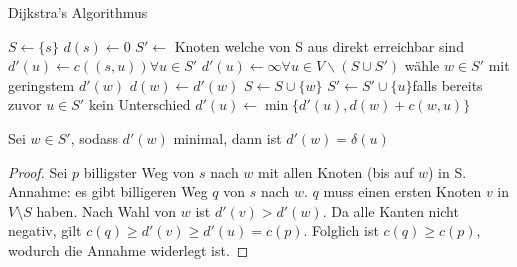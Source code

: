             \begin{algorithm}
            	\capstart
            	\caption{Dijkstra's Algorithmus}
            	\begin{algorithmic}
            		\State $S\gets \{s\}$
            		\State $d(s)\gets 0$
            		\State $S'\gets$  \Comment Knoten welche von S aus direkt erreichbar sind
            		\State $d'(u)\gets c((s,u)) \forall u\in S'$
            		\State $d'(u)\gets \infty \forall u\in V\backslash \left(S\cup S'\right)$
            			\State wähle $w\in S'$ mit geringstem $d'(w)$
            			\State $d(w)\gets d'(w)$
            			\State $S\gets S\cup \{w\}$
            					\State $S'\gets S'\cup \{u\}$\Comment falls bereits zuvor $u\in S'$ kein Unterschied
            					\State $d'(u)\gets \min\{d'(u),d(w)+c(w,u)\}$
            				\EndIf
            			\EndFor
            		\EndWhile
            	\end{algorithmic}
            	\label{alg:Dijkstras}
            \end{algorithm}
            


            \begin{lemma}
                Sei $w \in S'$, sodass $d'(w)$ minimal, dann ist $d'(w) = \delta(u)$
                \begin{proof}
                    Sei $p$ billigster Weg von $s$ nach $w$ mit allen Knoten (bis auf $w$) in S.
                    Annahme: es gibt billigeren Weg $q$ von $s$ nach $w$. $q$ muss einen ersten Knoten $v$ in $V \setminus S$ haben.
                    Nach Wahl von $w$ ist $d'(v) > d'(w)$.
                    Da alle Kanten nicht negativ, gilt $c(q) \ge d'(v) \ge d'(u) = c(p)$.
                    Folglich ist $c(q) \ge c(p)$, wodurch die Annahme widerlegt ist.
                \end{proof}
            \end{lemma}

